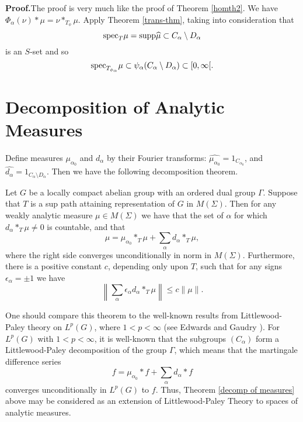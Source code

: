 \documentclass[12pt,leqno]{article}
\def\supp{{\rm supp}}
\def\spec{{\rm spec}}
\begin{document}
{\bf Proof.}\quad The proof is very much like the 
proof of Theorem \ref{homth2}.  
We have $\Phi_\alpha (\nu)*\mu=\nu*_{T_\phi}\mu$.
Apply Theorem \ref{trans-thm}, taking into consideration that
$$\spec_T\mu=\supp \widehat{\mu}\subset C_\alpha\setminus D_\alpha$$
is an $S$-set and so 
$$\spec_{T_{\phi_\alpha}}\mu\subset \psi_\alpha(C_\alpha\setminus D_\alpha)\subset [0,\infty[.$$








\section{Decomposition of Analytic Measures}

Define measures
$\mu_{\alpha_0}$ and $d_\alpha$ by their Fourier transforms: 
$\widehat{\mu_{\alpha_0}}=1_{C_{\alpha_0}}$,
and $\widehat{d_\alpha}=1_{C_\alpha\setminus D_\alpha}$.
Then we have the following decomposition theorem.

\begin{thm}
\label{decomp of measures}
Let $G$ be a locally compact abelian group with an ordered dual
group $\Gamma$.
Suppose that
$T$ is a sup path attaining representation of $G$ in $M(\Sigma)$.
Then for any weakly analytic measure $\mu \in M(\Sigma)$ we have
that the set of $\alpha$ for which $d_\alpha *_T\mu \ne 0$ is countable,
and that
\begin{equation}
\mu = \mu_{\alpha_0}*_T\mu+ \sum_\alpha d_\alpha *_T\mu ,
\end{equation}
where the right side converges unconditionally in norm
in $M(\Sigma)$.
Furthermore, there is a positive constant $c$, depending only upon
$T$, such that for any signs $\epsilon_\alpha = \pm 1$ we have
\begin{equation}
\left\| \sum_\alpha \epsilon_\alpha d_\alpha*_T\mu \right\| \le c \|\mu\| .
\end{equation}
\end{thm}
%
One should compare this theorem
 to the well-known results
from Littlewood-Paley theory on $L^p(G)$, where $1<p<\infty$ (see Edwards and Gaudry \cite{eg}).
For $L^p(G)$ with 
$1<p<\infty$, 
it is well-known that the subgroups $(C_\alpha)$
form a Littlewood-Paley decomposition of the group $\Gamma$, which means that the martingale difference series 
$$f= \mu_{\alpha_0}*f+ \sum_\alpha d_\alpha *f $$
converges unconditionally in $L^p(G)$ to $f$.
Thus, Theorem \ref{decomp of measures} above may be considered as an extension
of Littlewood-Paley Theory to spaces of analytic measures.  
\end{document}
